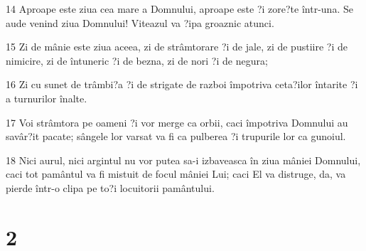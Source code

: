 \par 14 Aproape este ziua cea mare a Domnului, aproape este ?i zore?te într-una. Se aude venind ziua Domnului! Viteazul va ?ipa groaznic atunci.
\par 15 Zi de mânie este ziua aceea, zi de strâmtorare ?i de jale, zi de pustiire ?i de nimicire, zi de întuneric ?i de bezna, zi de nori ?i de negura;
\par 16 Zi cu sunet de trâmbi?a ?i de strigate de razboi împotriva ceta?ilor întarite ?i a turnurilor înalte.
\par 17 Voi strâmtora pe oameni ?i vor merge ca orbii, caci împotriva Domnului au savâr?it pacate; sângele lor varsat va fi ca pulberea ?i trupurile lor ca gunoiul.
\par 18 Nici aurul, nici argintul nu vor putea sa-i izbaveasca în ziua mâniei Domnului, caci tot pamântul va fi mistuit de focul mâniei Lui; caci El va distruge, da, va pierde într-o clipa pe to?i locuitorii pamântului.

\chapter{2}

